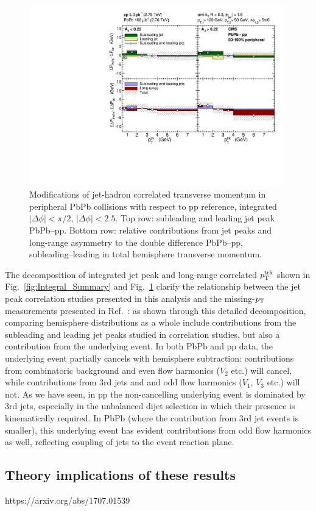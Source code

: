 \begin{figure}[hbt]
\begin{center} 
\includegraphics[width=0.99\textwidth]{figures/Results/Integral_PbPb_pp_Summary_Peripheral.pdf}
\caption[Relative contributions from jet peaks and long-range asymmetry to the double difference PbPb--pp, subleading--leading in total hemisphere transverse momentum for peripheral collisions]{Modifications of jet-hadron correlated transverse momentum in peripheral PbPb collisions with respect to pp reference, integrated $|\Delta\phi| < \pi/2$, $|\Delta\phi| < 2.5$.  Top row:  subleading and leading jet peak PbPb--pp.  Bottom row:  relative contributions from jet peaks and long-range asymmetry to the double difference PbPb--pp, subleading--leading in total hemisphere transverse momentum. }
\label{fig:Integral_Summary_Peripheral} 
\end{center} 
\end{figure} 


The decomposition of integrated jet peak and long-range correlated $p_{\rm T}^{\rm trk}$ shown in Fig.~\ref{fig:Integral_Summary} and Fig.~\ref{fig:Integral_Summary_Peripheral} clarify the relationship between the jet peak correlation studies presented in this analysis and the missing-$p_{\rm T}$ measurements presented in Ref.~\cite{HIN_2014_010}:  as shown through this detailed decomposition, comparing hemisphere distributions as a whole include contributions from the subleading and leading jet peaks studied in correlation studies, but also a contribution from the underlying event.  In both PbPb and pp data, the underlying event partially cancels with hemisphere subtraction:  contributions from combinatoric background and even flow harmonics ($V_{2}$ etc.) will cancel, while contributions from 3rd jets and and odd flow harmonics ($V_{1}$, $V_{3}$ etc.) will not.  As we have seen, in pp the non-cancelling underlying event is dominated by 3rd jets, especially in the unbalanced dijet selection in which their presence is kinematically required.  In PbPb (where the contribution from 3rd jet events is smaller), this underlying event has evident contributions from odd flow harmonics as well, reflecting coupling of jets to the event reaction plane.  

\clearpage


\subsection{Theory implications of these results}


https://arxiv.org/abs/1707.01539

